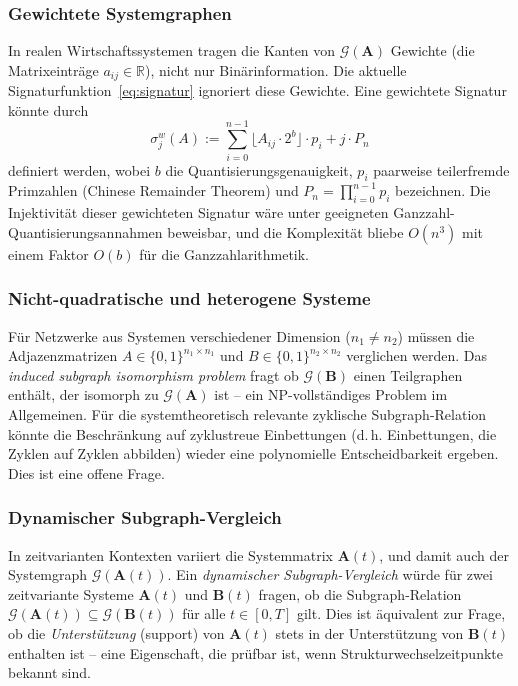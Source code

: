 ﻿\documentclass[12pt, a4paper, titlepage]{report}
\theoremstyle{definition}
\theoremstyle{remark}
\newcommand{\R}{\mathbb{R}}
\newcommand{\vA}{\bm{A}}
\newcommand{\vB}{\bm{B}}
\begin{document}
\subsubsection*{Gewichtete Systemgraphen}

In realen Wirtschaftssystemen tragen die Kanten von $\mathcal{G}(\vA)$ Gewichte
(die Matrixeinträge $a_{ij} \in \R$), nicht nur Binärinformation. Die aktuelle
Signaturfunktion~\eqref{eq:signatur} ignoriert diese Gewichte. Eine gewichtete
Signatur könnte durch
\begin{equation}
  \sigma_j^w(A) := \sum_{i=0}^{n-1} \lfloor A_{ij} \cdot 2^b \rfloor \cdot p_i + j \cdot P_n
  \label{eq:weight_sig}
\end{equation}
definiert werden, wobei $b$ die Quantisierungsgenauigkeit, $p_i$ paarweise teilerfremde
Primzahlen (Chinese Remainder Theorem) und $P_n = \prod_{i=0}^{n-1} p_i$ bezeichnen.
Die Injektivität dieser gewichteten Signatur wäre unter geeigneten Ganzzahl-
Quantisierungsannahmen beweisbar, und die Komplexität bliebe $O(n^3)$ mit einem
Faktor $O(b)$ für die Ganzzahlarithmetik.

\subsubsection*{Nicht-quadratische und heterogene Systeme}

Für Netzwerke aus Systemen verschiedener Dimension ($n_1 \neq n_2$) müssen die
Adjazenzmatrizen $A \in \{0,1\}^{n_1 \times n_1}$ und $B \in \{0,1\}^{n_2 \times n_2}$
verglichen werden. Das \emph{induced subgraph isomorphism problem} fragt ob
$\mathcal{G}(\vB)$ einen Teilgraphen enthält, der isomorph zu $\mathcal{G}(\vA)$ ist --
ein NP-vollständiges Problem im Allgemeinen. Für die systemtheoretisch relevante
zyklische Subgraph-Relation könnte die Beschränkung auf zyklustreue Einbettungen
(d.\,h. Einbettungen, die Zyklen auf Zyklen abbilden) wieder eine polynomielle
Entscheidbarkeit ergeben. Dies ist eine offene Frage.

\subsubsection*{Dynamischer Subgraph-Vergleich}

In zeitvarianten Kontexten variiert die Systemmatrix $\vA(t)$, und damit auch
der Systemgraph $\mathcal{G}(\vA(t))$. Ein \emph{dynamischer Subgraph-Vergleich}
würde für zwei zeitvariante Systeme $\vA(t)$ und $\vB(t)$ fragen, ob die
Subgraph-Relation $\mathcal{G}(\vA(t)) \subseteq \mathcal{G}(\vB(t))$ für alle
$t \in [0, T]$ gilt. Dies ist äquivalent zur Frage, ob die \emph{Unterstützung}
(support) von $\vA(t)$ stets in der Unterstützung von $\vB(t)$ enthalten ist --
eine Eigenschaft, die prüfbar ist, wenn Strukturwechselzeitpunkte bekannt sind.
\end{document}
